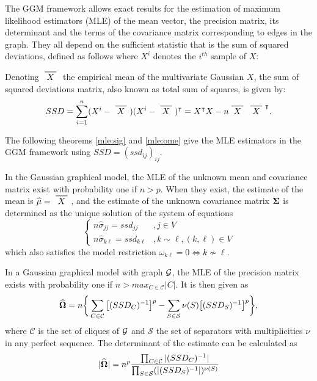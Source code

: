 The GGM framework allows exact results for the estimation of maximum likelihood estimators (MLE) of the mean vector, the precision matrix, its determinant and the terms of the covariance matrix corresponding to edges in the graph. They all depend on the sufficient statistic that is the sum of squared deviations, defined as follows where $X^i$ denotes the $i^{th}$ sample of $X$:
\begin{definition}
Denoting $\xbar{X}$ the empirical mean of the multivariate Gaussian $X$, the sum of squared deviations matrix, also known as total sum of squares,  is given by:
$$SSD = \sum_{i=1}^n (X^i - \xbar{X})(X^i - \xbar{X})^\intercal = X^\intercal X - n  \xbar{X} \,\xbar{X}^\intercal.$$
\end{definition}
The following theorems \ref{mle:sig} and \ref{mle:ome} give the MLE estimators in the GGM framework using $SSD=(ssd_{ij})_{ij}$.
 
\begin{theorem}\label{mle:sig}
In the Gaussian graphical model,  the MLE of the unknown mean and covariance matrix exist with probability one if $n>p$. When they exist, the estimate of the mean is $\widehat{\mu} = \xbar{X}$, and the estimate of the unknown covariance matrix ${\boldsymbol{\Sigma}}$ is determined as the unique solution of the system of equations
\begin{equation*}
 \left\{
 \begin{array}{rl}
 n\widehat{\sigma}_{jj} = ssd_{jj}&, j\in V\\
 n\widehat{\sigma}_{k\ell} = ssd_{k\ell}&, k\sim\ell, (k,\ell) \in V
 \end{array} \right.
\end{equation*}  
which also satisfies the model restriction $\omega_{k\ell} =0 \iff k\nsim \ell $.
\end{theorem}

\begin{theorem}\label{mle:ome}
In a Gaussian graphical model with graph $\mathcal{G}$, the MLE of the precision matrix exists with probability one if $n>max_{C\in\mathcal{C}}|C|$. It is then given as
$$\widehat{{\boldsymbol{\Omega}}} = n \bigg\{\sum_{C\in\mathcal{C}} \big[(SSD_C)^{-1}\big]^p-\sum_{S\in\mathcal{S}} \nu(S) \big[(SSD_S)^{-1}\big]^p\bigg\},$$
where $\mathcal{C}$ is the set of cliques of $\mathcal{G}$ and $\mathcal{S}$ the set of separators with multiplicities $\nu$ in any perfect sequence. The determinant of the estimate can be calculated as
$$|\widehat{{\boldsymbol{\Omega}}}| = n^p \dfrac{\prod_{C\in\mathcal{C}}|(SSD_C)^{-1}|}{\prod_{S\in\mathcal{S}} (|(SSD_S)^{-1}|)^{\nu(S)}}$$
\end{theorem}
 
